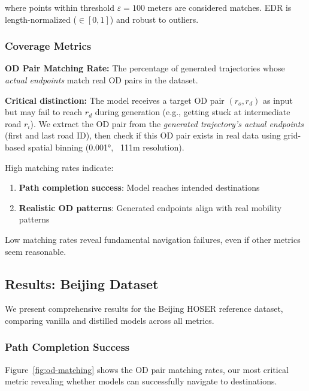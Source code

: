 where points within threshold $\varepsilon = 100$ meters are considered matches. EDR is length-normalized ($\in [0,1]$) and robust to outliers.

\subsubsection{Coverage Metrics}

\textbf{OD Pair Matching Rate:} The percentage of generated trajectories whose \emph{actual endpoints} match real OD pairs in the dataset.

\textbf{Critical distinction:} The model receives a target OD pair $(r_o, r_d)$ as input but may fail to reach $r_d$ during generation (e.g., getting stuck at intermediate road $r_i$). We extract the OD pair from the \emph{generated trajectory's actual endpoints} (first and last road ID), then check if this OD pair exists in real data using grid-based spatial binning (0.001°, ~111m resolution).

High matching rates indicate:
\begin{enumerate}[noitemsep,topsep=0pt]
\item \textbf{Path completion success}: Model reaches intended destinations
\item \textbf{Realistic OD patterns}: Generated endpoints align with real mobility patterns
\end{enumerate}

Low matching rates reveal fundamental navigation failures, even if other metrics seem reasonable.

\subsection{Results: Beijing Dataset}
\label{sec:eval-beijing}

We present comprehensive results for the Beijing HOSER reference dataset, comparing vanilla and distilled models across all metrics.

\subsubsection{Path Completion Success}

Figure~\ref{fig:od-matching} shows the OD pair matching rates, our most critical metric revealing whether models can successfully navigate to destinations.

